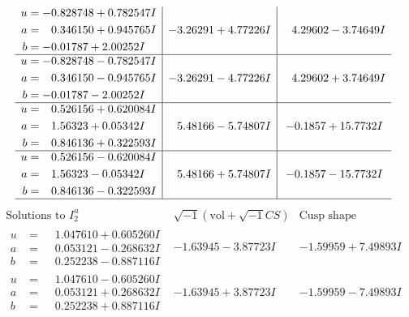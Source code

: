 \documentclass[1p]{elsarticle_modified}
\theoremstyle{definition}
\newcommand{\I}{\sqrt{-1}}
\begin{document}
$$\begin{array}{c|c|c}
\begin{aligned}
u &= -0.828748 + 0.782547 I \\
a &= \phantom{-}0.346150 + 0.945765 I \\
b &= -0.01787 + 2.00252 I\end{aligned}
 & -3.26291 + 4.77226 I & \phantom{-}4.29602 - 3.74649 I \\ \hline\begin{aligned}
u &= -0.828748 - 0.782547 I \\
a &= \phantom{-}0.346150 - 0.945765 I \\
b &= -0.01787 - 2.00252 I\end{aligned}
 & -3.26291 - 4.77226 I & \phantom{-}4.29602 + 3.74649 I \\ \hline\begin{aligned}
u &= \phantom{-}0.526156 + 0.620084 I \\
a &= \phantom{-}1.56323 + 0.05342 I \\
b &= \phantom{-}0.846136 + 0.322593 I\end{aligned}
 & \phantom{-}5.48166 - 5.74807 I & -0.1857 + 15.7732 I \\ \hline\begin{aligned}
u &= \phantom{-}0.526156 - 0.620084 I \\
a &= \phantom{-}1.56323 - 0.05342 I \\
b &= \phantom{-}0.846136 - 0.322593 I\end{aligned}
 & \phantom{-}5.48166 + 5.74807 I & -0.1857 - 15.7732 I\\
 \hline 
 \end{array}$$\newpage$$\begin{array}{c|c|c}  
\text{Solutions to }I^u_{2}& \I (\text{vol} + \sqrt{-1}CS) & \text{Cusp shape}\\
 \hline 
\begin{aligned}
u &= \phantom{-}1.047610 + 0.605260 I \\
a &= \phantom{-}0.053121 - 0.268632 I \\
b &= \phantom{-}0.252238 - 0.887116 I\end{aligned}
 & -1.63945 - 3.87723 I & -1.59959 + 7.49893 I \\ \hline\begin{aligned}
u &= \phantom{-}1.047610 - 0.605260 I \\
a &= \phantom{-}0.053121 + 0.268632 I \\
b &= \phantom{-}0.252238 + 0.887116 I\end{aligned}
 & -1.63945 + 3.87723 I & -1.59959 - 7.49893 I \\ \hline\begin{aligned}

\end{aligned}
\end{array}$$
\end{document}
